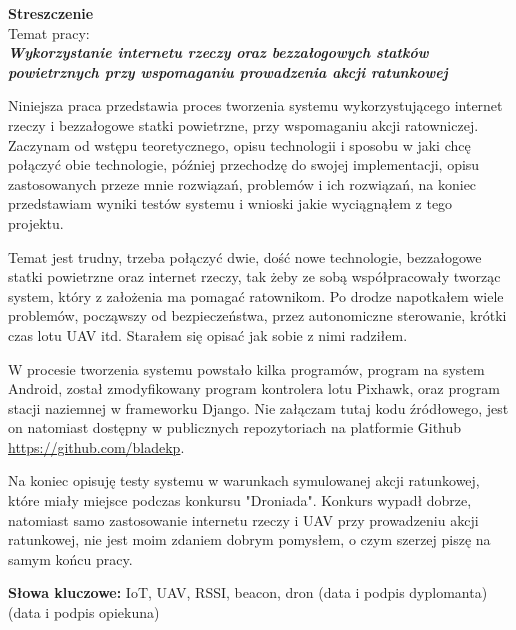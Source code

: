 \newpage
\begin{center}
 {\large\bf  Streszczenie} \\
\vskip 1cm
Temat pracy:\\
\textit{\bf Wykorzystanie internetu rzeczy oraz bezzałogowych
statków powietrznych przy wspomaganiu prowadzenia
akcji ratunkowej}\\
\end{center}

Niniejsza praca przedstawia proces tworzenia systemu wykorzystującego internet rzeczy i bezzałogowe statki powietrzne, przy wspomaganiu akcji ratowniczej. Zaczynam od wstępu teoretycznego, opisu technologii i sposobu w jaki chcę połączyć obie technologie, później przechodzę do swojej implementacji, opisu zastosowanych przeze mnie rozwiązań, problemów i ich rozwiązań, na koniec przedstawiam wyniki testów systemu i wnioski jakie wyciągnąłem z tego projektu.

Temat jest trudny, trzeba połączyć dwie, dość nowe technologie, bezzałogowe statki powietrzne oraz internet rzeczy, tak żeby ze sobą współpracowały tworząc system, który z założenia ma pomagać ratownikom. Po drodze napotkałem wiele problemów, począwszy od bezpieczeństwa, przez autonomiczne sterowanie, krótki czas lotu UAV itd. Starałem się opisać jak sobie z nimi radziłem.

W procesie tworzenia systemu powstało kilka programów, program na system Android, został zmodyfikowany program kontrolera lotu Pixhawk, oraz program stacji naziemnej w frameworku Django. Nie załączam tutaj kodu źródłowego, jest on natomiast dostępny w publicznych repozytoriach na platformie Github \url{https://github.com/bladekp}. 

Na koniec opisuję testy systemu w warunkach symulowanej akcji ratunkowej, które miały miejsce podczas konkursu "Droniada". Konkurs wypadł dobrze, natomiast samo zastosowanie internetu rzeczy i UAV przy prowadzeniu akcji ratunkowej, nie jest moim zdaniem dobrym pomysłem, o czym szerzej piszę na samym końcu pracy.

\vskip 2cm
\noindent
\textbf{Słowa kluczowe:} IoT, UAV, RSSI, beacon, dron
\vskip 2cm
\noindent
(data i podpis dyplomanta)\hfill (data i podpis opiekuna)
